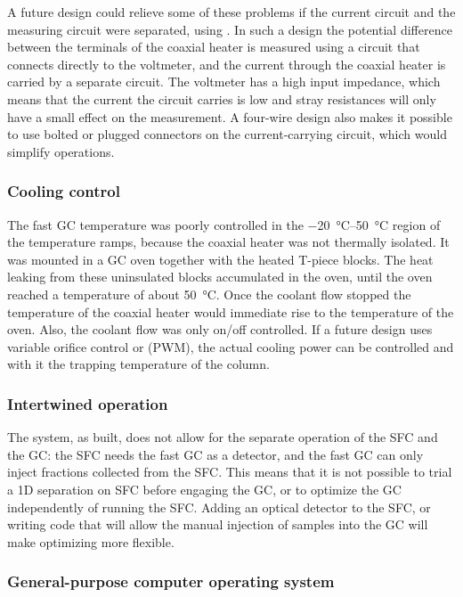 A future design could relieve some of these problems if the current circuit and
the measuring circuit were separated, using . In such a design the potential difference between the terminals of
the coaxial heater is measured using a circuit that connects directly to the
voltmeter, and the current through the coaxial heater is carried by a separate
circuit. The voltmeter has a high input impedance, which means that the current
the circuit carries is low and stray resistances will only have a small effect
on the measurement. A four-wire design also makes it possible to use bolted or
plugged connectors on the current-carrying circuit, which would simplify
operations.

\subsubsection{Cooling control}

The fast GC temperature was poorly controlled in the \SIrange{-20}{50}{\celsius}
region of the temperature ramps, because the coaxial heater was not thermally
isolated. It was mounted in a GC oven together with the heated T-piece blocks.
The heat leaking from these uninsulated blocks accumulated in the oven, until
the oven reached a temperature of about \SI{50}{\celsius}. Once the coolant flow
stopped the temperature of the coaxial heater would immediate rise to the
temperature of the oven. Also, the coolant flow was only on/off controlled. If a
future design uses variable orifice control or  (PWM), the actual cooling power can be controlled and with it the
trapping temperature of the column.

\subsubsection{Intertwined operation}

The system, as built, does not allow for the separate operation of the SFC and
the GC: the SFC needs the fast GC as a detector, and the fast GC can only inject
fractions collected from the SFC. This means that it is not possible to trial a
1D separation on SFC before engaging the \twoD GC, or to optimize the GC
independently of running the SFC. Adding an optical detector to the SFC, or
writing code that will allow the manual injection of samples into the GC will
make optimizing more flexible.

\subsubsection{General-purpose computer operating system}

